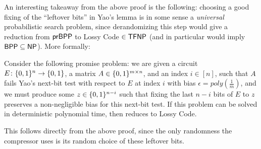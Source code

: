 An interesting takeaway from the above proof is the following: choosing a good fixing of the ``leftover bits'' in Yao's lemma is in some sense a \emph{universal} probabilistic search problem, since derandomizing this step would give a reduction from $\cl{prBPP}$ to {\sc Lossy Code} $\in \cl{TFNP}$ (and in particular would imply $\cl{BPP} \subseteq \cl{NP}$). More formally:
\begin{corollary}\label{lossy:cor:yao}
Consider the following promise problem: we are given a circuit $E\colon \{0,1\}^n \to \{0,1\}$, a matrix $A \in \{0,1\}^{m \times n}$, and an index $i \in [n]$, such that $A$ fails Yao's next-bit test with respect to $E$ at index $i$ with bias $\epsilon = poly(\frac{1}{m})$, and we must produce some $z\in \{0,1\}^{n-i}$ such that fixing the last $n-i$ bits of $E$ to $z$ preserves a non-negligible bias for this next-bit test. If this problem can be solved in deterministic polynomial time, then  reduces to {\sc Lossy Code}.
\end{corollary}
This follows directly from the above proof, since the only randomness the compressor uses is its random choice of these leftover bits.

